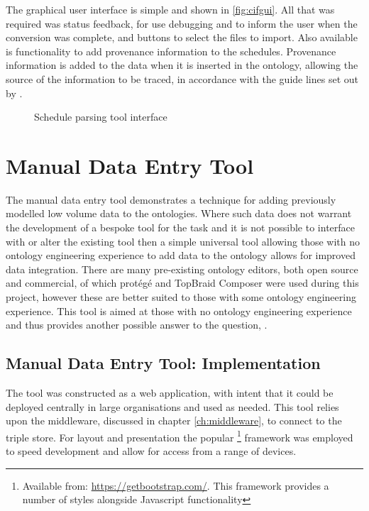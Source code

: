 The graphical user interface is simple and shown in \autoref{fig:cifgui}. All that was required was status feedback, for use debugging and to inform the user when the conversion was complete, and buttons to select the files to import. Also available is functionality to add provenance information to the schedules. Provenance information is added to the data when it is inserted in the ontology, allowing the source of the information to be traced, in accordance with the guide lines set out by \citet{Tutcher2015}.

\begin{figure}[H]
\myfloatalign
{}
\caption{Schedule parsing tool interface}
\label{fig:cifgui}
\end{figure}

\section{Manual Data Entry Tool}
\label{sec:manualtool}
The manual data entry tool demonstrates a technique for adding previously modelled low volume data to the ontologies. Where such data does not warrant the development of a bespoke tool for the task and it is not possible to interface with or alter the existing tool then a simple universal tool allowing those with no ontology engineering experience to add data to the ontology allows for improved data integration. There are many pre-existing ontology editors, both open source and commercial, of which protégé and TopBraid Composer were used during this project, however these are better suited to those with some ontology engineering experience. This tool is aimed at those with no ontology engineering experience and thus provides another possible answer to the question, \say{\QuestionOtherData}.

\subsection{Manual Data Entry Tool: Implementation}
The tool was constructed as a web application, with intent that it could be deployed centrally in large organisations and used as needed. This tool relies upon the middleware, discussed in chapter \ref{ch:middleware}, to connect to the triple store. For layout and presentation the popular \footnote{Available from: \url{https://getbootstrap.com/}. This framework provides a number of styles alongside Javascript functionality} framework was employed to speed development and allow for access from a range of devices.

